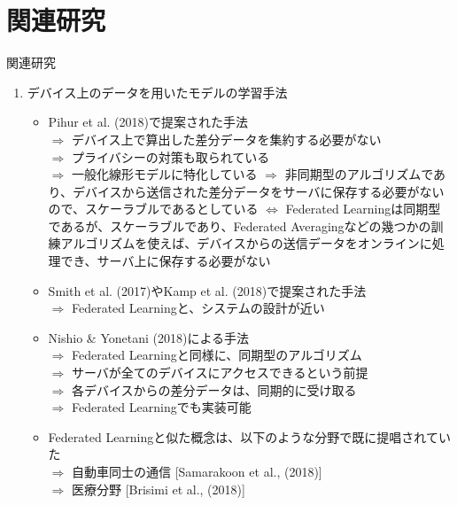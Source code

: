 \documentclass[dvipdfmx,notheorems,t]{beamer}
\begin{document}
\section{関連研究}

\begin{frame}{関連研究}

\begin{enumerate}
	\item デバイス上のデータを用いたモデルの学習手法
	\begin{itemize}
		\item Pihur et al. (2018)で提案された手法 \\
		$\Rightarrow$ デバイス上で算出した差分データを集約する必要がない \\
		$\Rightarrow$ プライバシーの対策も取られている \\
		$\Rightarrow$ 一般化線形モデルに特化している \newline \newline
		$\Rightarrow$ 非同期型のアルゴリズムであり、デバイスから送信された差分データをサーバに保存する必要がないので、スケーラブルであるとしている \newline \newline
		$\Leftrightarrow$ Federated Learningは同期型であるが、スケーラブルであり、Federated Averagingなどの幾つかの訓練アルゴリズムを使えば、デバイスからの送信データをオンラインに処理でき、サーバ上に保存する必要がない
		\newline
		
		\item Smith et al. (2017)やKamp et al. (2018)で提案された手法 \\
		$\Rightarrow$ Federated Learningと、システムの設計が近い
		
		\framebreak
		
		\item Nishio \& Yonetani (2018)による手法 \\
		$\Rightarrow$ Federated Learningと同様に、同期型のアルゴリズム \\
		$\Rightarrow$ サーバが全てのデバイスにアクセスできるという前提 \\
		$\Rightarrow$ 各デバイスからの差分データは、同期的に受け取る \\
		$\Rightarrow$ Federated Learningでも実装可能
		\newline
		
		\item Federated Learningと似た概念は、以下のような分野で既に提唱されていた \\
		$\Rightarrow$ 自動車同士の通信 [Samarakoon et al., (2018)] \\
		$\Rightarrow$ 医療分野 [Brisimi et al., (2018)]
	\end{itemize}
	

\end{enumerate}
\end{frame}
\end{document}
